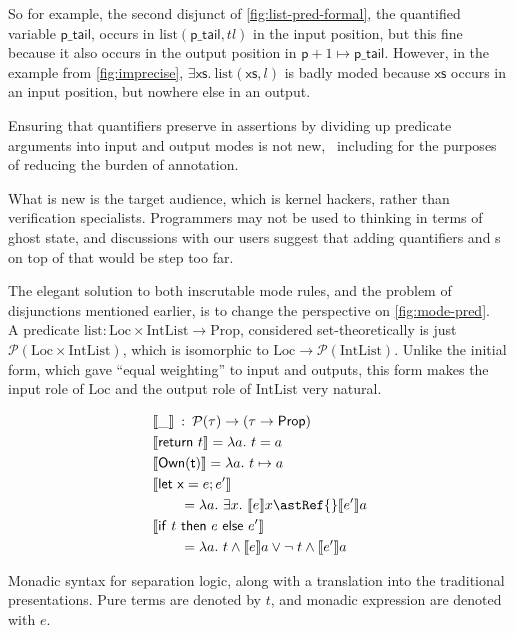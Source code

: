 So for example, the second disjunct of \cref{fig:list-pred-formal}, the
quantified variable $\mathsf{p\_tail}$, occurs in $\mathrm{list}
(\mathsf{p\_tail}, {tl})$ in the input position, but this fine because it also
occurs in the output position in $\mathsf{p} + 1 \mapsto{} \mathsf{p\_tail}$.
However, in the example from \cref{fig:imprecise}, $\exists \mathsf{xs}. \
\mathrm{list}(\mathsf{xs},l)$ is badly moded because $\mathsf{xs}$ occurs in an
input position, but nowhere else in an output.

Ensuring that quantifiers preserve  in assertions by
dividing up predicate arguments into input and output modes is
not new,~
including for the purposes of reducing the burden of
annotation.~

What is new is the target audience, which is kernel hackers, rather than
verification specialists. Programmers may not be used to thinking in terms of
ghost state, and discussions with our users suggest that adding quantifiers and
\kl{mode}s on top of that would be step too far.

The elegant solution to both inscrutable mode rules, and the problem of
disjunctions mentioned earlier, is to change the perspective on
\cref{fig:mode-pred}.~ A predicate
$\mathrm{list} : \mathrm{Loc} \times \mathrm{IntList} \rightarrow
\mathrm{Prop}$, considered set-theoretically is just $\mathcal{P} (\mathrm{Loc}
\times \mathrm{IntList})$, which is isomorphic to $\mathrm{Loc} \rightarrow
\mathcal{P} (\mathrm{IntList})$. Unlike the initial form, which gave ``equal
weighting'' to input and outputs, this form makes the input role of
$\mathrm{Loc}$ and the output role of $\mathrm{IntList}$ very natural.

\begin{marginfigure}
    \begin{align*}
        &\llbracket \_ \rrbracket \::\: \mathcal{P}(\tau) \rightarrow (\tau \rightarrow \mathsf{Prop}) \\
        &\llbracket \mathsf{return}\ t \rrbracket = \lambda a.\ t = a \\
        &\llbracket \mathsf{Own(t)} \rrbracket = \lambda a.\ t \mapsto{} a \\
        &\llbracket \mathsf{let\ x} = e; e' \rrbracket \\
        &\qquad = \lambda a.\ \exists x.\ \llbracket e \rrbracket x \astRef{} \llbracket e' \rrbracket a \\
        &\llbracket \mathsf{if}\ t\ \mathsf{then}\ e\ \mathsf{else}\ e' \rrbracket \\
        &\qquad = \lambda a.\  t \wedge \llbracket e \rrbracket a \vee \neg\;t \wedge \llbracket e' \rrbracket a
    \end{align*}
    \caption{Monadic syntax for separation logic, along with a translation into the traditional presentations. Pure
        terms are denoted by $t$, and monadic expression are denoted with $e$.}\label{fig:monad-sl}
\end{marginfigure}

